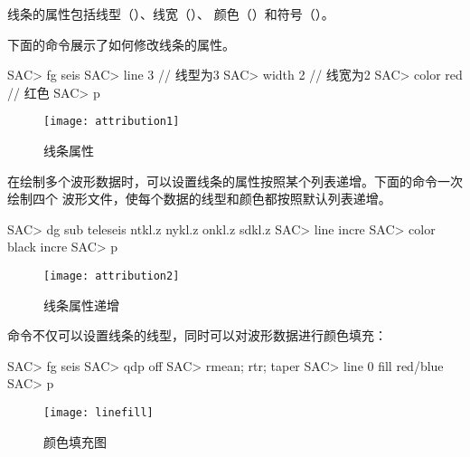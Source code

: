 线条的属性包括线型（）、线宽（）、
颜色（）和符号（）。

下面的命令展示了如何修改线条的属性。
\begin{SACCode}
SAC> fg seis
SAC> line 3         // 线型为3
SAC> width 2        // 线宽为2
SAC> color red      // 红色
SAC> p
\end{SACCode}

\begin{figure}[H]
\centering
\texttt{[image: attribution1]}
\caption{线条属性}
\end{figure}

在绘制多个波形数据时，可以设置线条的属性按照某个列表递增。下面的命令一次绘制四个
波形文件，使每个数据的线型和颜色都按照默认列表递增。
\begin{SACCode}
SAC> dg sub teleseis ntkl.z nykl.z onkl.z sdkl.z
SAC> line incre
SAC> color black incre
SAC> p
\end{SACCode}

\begin{figure}[H]
\centering
\texttt{[image: attribution2]}
\caption{线条属性递增}
\end{figure}

命令不仅可以设置线条的线型，同时可以对波形数据进行颜色填充：
\begin{SACCode}
SAC> fg seis
SAC> qdp off
SAC> rmean; rtr; taper
SAC> line 0 fill red/blue
SAC> p 
\end{SACCode}

\begin{figure}[H]
\centering
\texttt{[image: linefill]}
\caption{颜色填充图}
\end{figure}
